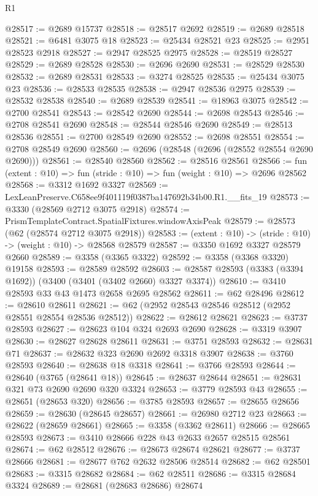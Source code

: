 \begin{lexlean}{R1}
\begin{coremodule}
@28517 := @2689 @15737
@28518 := @28517 @2692
@28519 := @2689 @28518
@28521 := @6481 @3075 @18
@28523 := @25434 @28521 @23
@28525 := @2951 @28523 @2918
@28527 := @2947 @28525 @2975
@28528 := @28519 @28527
@28529 := @2689 @28528
@28530 := @2696 @2690
@28531 := @28529 @28530
@28532 := @2689 @28531
@28533 := @3274 @28525
@28535 := @25434 @3075 @23
@28536 := @28533 @28535
@28538 := @2947 @28536 @2975
@28539 := @28532 @28538
@28540 := @2689 @28539
@28541 := @18963 @3075
@28542 := @2700 @28541
@28543 := @28542 @2690
@28544 := @2698 @28543
@28546 := @2708 @28541 @2690
@28548 := @28544 @28546 @2690
@28549 := @28513 @28536
@28551 := @2700 @28549 @2690
@28552 := @2698 @28551
@28554 := @2708 @28549 @2690
@28560 := @2696 (@28548 (@2696 (@28552 @28554 @2690 @2690)))
@28561 := @28540 @28560
@28562 := @28516 @28561
@28566 := fun (extent : @10) => fun (stride : @10) => fun (weight : @10) => @2696 @28562
@28568 := @3312 @1692 @3327
@28569 := LexLeanPreserve.C658ee9f401119f0387ba147692b34b00.R1.__fits_19
@28573 := @3330 (@28569 @2712 @3075 @2918)
@28574 := PrismTemplateContract.SpatialFixtures.windowAxisPeak
@28579 := @28573 (@62 (@28574 @2712 @3075 @2918))
@28583 := (extent : @10) -> (stride : @10) -> (weight : @10) -> @28568 @28579
@28587 := @3350 @1692 @3327 @28579 @2660
@28589 := @3358 (@3365 @3322)
@28592 := @3358 (@3368 @3320) @19158
@28593 := @28589 @28592
@28603 := @28587 @28593 (@3383 (@3394 @1692)) (@3400 (@3401 (@3402 @2660) @3327 @3374))
@28610 := @3410 @28593 @33 @43 @1473 @2658 @2695 @28562
@28611 := @62 @28496
@28612 := @28610 @28611
@28621 := @62 (@2952 @28543 @28546 @28512 (@2952 @28551 @28554 @28536 @28512))
@28622 := @28612 @28621
@28623 := @3737 @28593
@28627 := @28623 @104 @324 @2693 @2690
@28628 := @3319 @3907
@28630 := @28627 @28628 @28611
@28631 := @3751 @28593
@28632 := @28631 @71
@28637 := @28632 @323 @2690 @2692 @3318 @3907
@28638 := @3760 @28593
@28640 := @28638 @18 @3318
@28641 := @3766 @28593
@28644 := @28640 (@3765 (@28641 @18))
@28645 := @28637 @28644
@28651 := @28631 @321 @73 @2690 @2690 @320 @3324
@28653 := @3779 @28593 @43
@28655 := @28651 (@28653 @320)
@28656 := @3785 @28593
@28657 := @28655 @28656
@28659 := @28630 (@28645 @28657)
@28661 := @26980 @2712 @23
@28663 := @28622 (@28659 @28661)
@28665 := @3358 (@3362 @28611)
@28666 := @28665 @28593
@28673 := @3410 @28666 @228 @43 @2633 @2657 @28515 @28561
@28674 := @62 @28512
@28676 := @28673 @28674 @28621
@28677 := @3737 @28666
@28681 := @28677 @762 @2632 @28506 @28514
@28682 := @62 @28501
@28683 := @3315 @28682
@28684 := @62 @28511
@28686 := @3315 @28684 @3324
@28689 := @28681 (@28683 @28686) @28674

\end{coremodule}
\end{lexlean}

